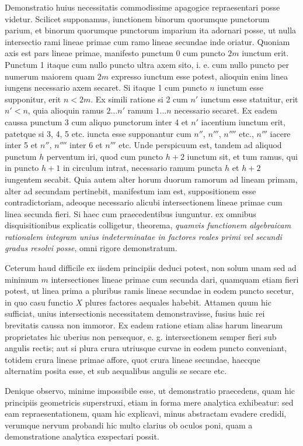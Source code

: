  Demonstratio huius necessitatis commodissime apagogice repraesentari posse videtur. Scilicet supponamus, iunctionem binorum quorumque punctorum parium, et binorum quorumque punctorum imparium ita adornari posse, ut nulla intersectio rami lineae primae cum ramo lineae secundae inde oriatur. Quoniam axis est pars lineae primae, manifesto punctum 0 cum puncto $2m$ iunctum erit. Punctum 1 itaque cum nullo puncto ultra axem sito, i. e. cum nullo puncto per numerum maiorem quam $2m$ expresso iunctum esse potest, alioquin enim linea iungens necessario axem secaret. Si itaque 1 cum puncto $n$ iunctum esse supponitur, erit $n<2m$. Ex simili ratione si 2 cum $n'$ iunctum esse statuitur, erit $n'<n$, quia alioquin ramus $2\ldots n'$ ramum $1\ldots n$ necessario secaret. Ex eadem caussa punctum 3 cum aliquo punctorum inter 4 et $n'$ iacentium iunctum erit, patetque si 3, 4, 5 etc. iuncta esse supponantur cum $n''$, $n'''$, $n''''$ etc., $n'''$ iacere inter 5 et $n''$, $n''''$ inter 6 et $n'''$ etc. Unde perspicuum est, tandem ad aliquod punctum $h$ perventum iri, quod cum puncto $h+2$ iunctum sit, et tum ramus, qui in puncto $h+1$ in circulum intrat, necessario ramum puncta $h$ et $h+2$ iungentem secabit. Quia autem alter horum duorum ramorum ad lineam primam, alter ad secundam pertinebit, manifestum iam est, suppositionem esse contradictoriam, adeoque necessario alicubi intersectionem lineae primae cum linea secunda fieri.
Si haec cum praecedentibus iunguntur. ex omnibus disquisitionibus explicatis colligetur, theorema, \textit{quamvis functionem algebraicam rationalem integram unius indeterminatae in factores reales primi vel secundi gradus resolvi posse}, omni rigore demonstratum.

 Ceterum haud difficile ex iisdem principiis deduci potest, non solum unam sed ad minimum $m$ intersectiones lineae primae cum secunda dari, quamquam etiam fieri potest, ut linea prima a pluribus ramis lineae secundae in eodem puncto secetur, in quo casu functio $X$ plures factores aequales habebit. Attamen quum hic sufficiat, unius intersectionis necessitatem demonstravisse, fusius huic rei brevitatis caussa non immoror. Ex eadem ratione etiam alias harum linearum proprietates hic uberius non persequor, e. g. intersectionem semper fieri sub angulis rectis; aut si plura crura utriusque curvae in eodem puncto conveniant, totidem crura lineae primae affore, quot crura lineae secundae, haecque alternatim posita esse, et sub aequalibus angulis se secare etc.

Denique observo, minime impossibile esse, ut demonstratio praecedens, quam hic principiis geometricis superstruxi, etiam in forma mere analytica exhibeatur: sed eam repraesentationem, quam hic explicavi, minus abstractam evadere credidi, verumque nervum probandi hic multo clarius ob oculos poni, quam a demonstratione analytica exspectari possit.

